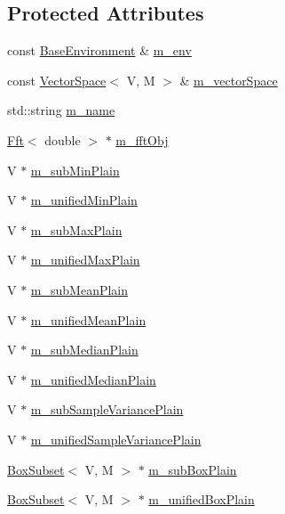 \subsection*{Protected Attributes}
\begin{DoxyCompactItemize}
\item 
const \hyperlink{class_q_u_e_s_o_1_1_base_environment}{Base\-Environment} \& \hyperlink{class_q_u_e_s_o_1_1_base_vector_sequence_a8e8824d2a63c5a43bcc6473e3a0491e8}{m\-\_\-env}
\item 
const \hyperlink{class_q_u_e_s_o_1_1_vector_space}{Vector\-Space}$<$ V, M $>$ \& \hyperlink{class_q_u_e_s_o_1_1_base_vector_sequence_a4bd171e39ed050ff105c808336f35198}{m\-\_\-vector\-Space}
\item 
std\-::string \hyperlink{class_q_u_e_s_o_1_1_base_vector_sequence_a3c379b2f7c20a2a1dd083ea43fca1494}{m\-\_\-name}
\item 
\hyperlink{class_q_u_e_s_o_1_1_fft}{Fft}$<$ double $>$ $\ast$ \hyperlink{class_q_u_e_s_o_1_1_base_vector_sequence_add593820ac53e4adccb3002ba0becfa7}{m\-\_\-fft\-Obj}
\item 
V $\ast$ \hyperlink{class_q_u_e_s_o_1_1_base_vector_sequence_ab4be9e46882547032a1b738b6fafc2f8}{m\-\_\-sub\-Min\-Plain}
\item 
V $\ast$ \hyperlink{class_q_u_e_s_o_1_1_base_vector_sequence_a8401f459127618bbdcb0826ddb69b550}{m\-\_\-unified\-Min\-Plain}
\item 
V $\ast$ \hyperlink{class_q_u_e_s_o_1_1_base_vector_sequence_a1f24826fd2ca206a6e2662ade55dc5cb}{m\-\_\-sub\-Max\-Plain}
\item 
V $\ast$ \hyperlink{class_q_u_e_s_o_1_1_base_vector_sequence_a5abbf8a1b56ffd00f00a065ff1af1e68}{m\-\_\-unified\-Max\-Plain}
\item 
V $\ast$ \hyperlink{class_q_u_e_s_o_1_1_base_vector_sequence_aea341eac0220157a44f373e1377e0ca0}{m\-\_\-sub\-Mean\-Plain}
\item 
V $\ast$ \hyperlink{class_q_u_e_s_o_1_1_base_vector_sequence_a0bb5f2fa3d8369412b8cf5f6795b95b4}{m\-\_\-unified\-Mean\-Plain}
\item 
V $\ast$ \hyperlink{class_q_u_e_s_o_1_1_base_vector_sequence_a99ab57b8cb62b14eedd606b9d2e75672}{m\-\_\-sub\-Median\-Plain}
\item 
V $\ast$ \hyperlink{class_q_u_e_s_o_1_1_base_vector_sequence_ac723ac11f629ba07915f7520b36e4138}{m\-\_\-unified\-Median\-Plain}
\item 
V $\ast$ \hyperlink{class_q_u_e_s_o_1_1_base_vector_sequence_a25dc9797633cb4b23b7330c5d3de9dd7}{m\-\_\-sub\-Sample\-Variance\-Plain}
\item 
V $\ast$ \hyperlink{class_q_u_e_s_o_1_1_base_vector_sequence_ab6fa4daa233c386ea96718cf6cac603b}{m\-\_\-unified\-Sample\-Variance\-Plain}
\item 
\hyperlink{class_q_u_e_s_o_1_1_box_subset}{Box\-Subset}$<$ V, M $>$ $\ast$ \hyperlink{class_q_u_e_s_o_1_1_base_vector_sequence_a8fa117289936a6b0cd83dd55aaf55047}{m\-\_\-sub\-Box\-Plain}
\item 
\hyperlink{class_q_u_e_s_o_1_1_box_subset}{Box\-Subset}$<$ V, M $>$ $\ast$ \hyperlink{class_q_u_e_s_o_1_1_base_vector_sequence_a13e15d877a0826605eb62fd65244761a}{m\-\_\-unified\-Box\-Plain}
\end{DoxyCompactItemize}


